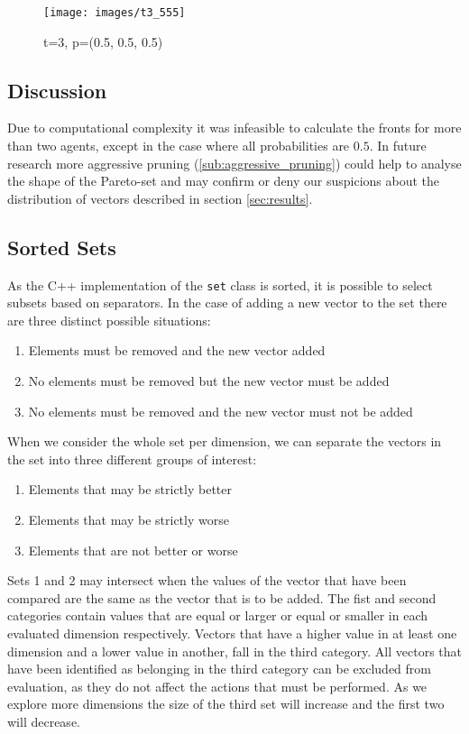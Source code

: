 \documentclass{article}
\begin{document}
	\begin{figure}
		\centering
		\texttt{[image: images/t3\_555]}
		\caption{t=3, p=(0.5, 0.5, 0.5)}
		\label{fig:t3_555}
	\end{figure}

	\newpage
	\begin{multicols}{2}
	\section{Discussion}
	\label{sec:discussion}
	Due to computational complexity it was infeasible to calculate the fronts
	for more than two agents, except in the case where all probabilities are
	$0.5$. In future research more aggressive pruning
	(\ref{sub:aggressive_pruning}) could help to analyse the shape of the
	Pareto-set and may confirm or deny our suspicions about the distribution of
	vectors described in section \ref{sec:results}.
	\subsection{Sorted Sets}
		\label{sub:sorted_sets}
		As the C++ implementation of the \texttt{set} class is sorted, it is
		possible to select subsets based on separators. In the case of adding a
		new vector to the set there are three distinct possible situations:
		\begin{enumerate}
			\item Elements must be removed and the new vector added
			\item No elements must be removed but the new vector must be added
			\item No elements must be removed and the new vector must not be added
		\end{enumerate}
		When we consider the whole set per dimension, we can separate the vectors
		in the set into three different groups of interest:
		\begin{enumerate}
			\item Elements that may be strictly better
			\item Elements that may be strictly worse
			\item Elements that are not better or worse
		\end{enumerate}
		Sets 1 and 2 may intersect when the values of the vector that have been
		compared are the same as the vector that is to be added. The fist and
		second categories contain values that are equal or larger or equal or
		smaller in each evaluated dimension respectively. Vectors that have a
		higher value in at least one dimension and a lower value in another, fall
		in the third category. All vectors that have been identified as belonging
		in the third category can be excluded from evaluation, as they do not
		affect the actions that must be performed. As we explore more dimensions
		the size of the third set will increase and the first two will decrease.


\end{multicols}
\end{document}
